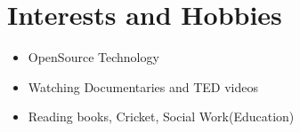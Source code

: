 \documentclass{article}
\begin{document}
\vspace*{4mm}
\section{Interests and Hobbies}
\vspace*{2mm}
\begin{itemize}
\item OpenSource Technology
\item Watching Documentaries and TED videos
\item Reading books, Cricket, Social Work(Education)
\end{itemize}
%
\end{document}
